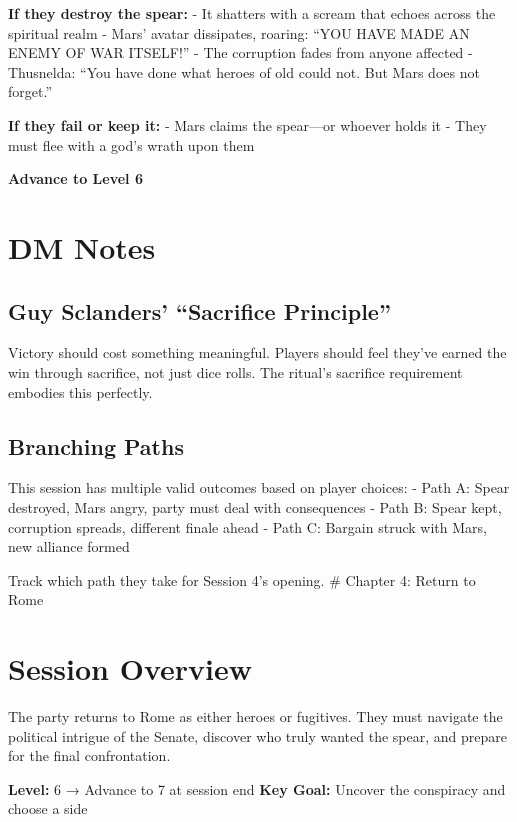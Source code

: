 \documentclass[
]{book}
\begin{document}
\textbf{If they destroy the spear:} - It shatters with a scream that
echoes across the spiritual realm - Mars' avatar dissipates, roaring:
``YOU HAVE MADE AN ENEMY OF WAR ITSELF!'' - The corruption fades from
anyone affected - Thusnelda: ``You have done what heroes of old could
not. But Mars does not forget.''

\textbf{If they fail or keep it:} - Mars claims the spear---or whoever
holds it - They must flee with a god's wrath upon them

\textbf{Advance to Level 6}

\section{DM Notes}\label{dm-notes-2}

\subsection{Guy Sclanders' ``Sacrifice
Principle''}\label{guy-sclanders-sacrifice-principle}

Victory should cost something meaningful. Players should feel they've
earned the win through sacrifice, not just dice rolls. The ritual's
sacrifice requirement embodies this perfectly.

\subsection{Branching Paths}\label{branching-paths}

This session has multiple valid outcomes based on player choices: - Path
A: Spear destroyed, Mars angry, party must deal with consequences - Path
B: Spear kept, corruption spreads, different finale ahead - Path C:
Bargain struck with Mars, new alliance formed

Track which path they take for Session 4's opening. \# Chapter 4: Return
to Rome

\section{Session Overview}\label{session-overview-3}

The party returns to Rome as either heroes or fugitives. They must
navigate the political intrigue of the Senate, discover who truly wanted
the spear, and prepare for the final confrontation.

\textbf{Level:} 6 → Advance to 7 at session end \textbf{Key Goal:}
Uncover the conspiracy and choose a side
\end{document}
